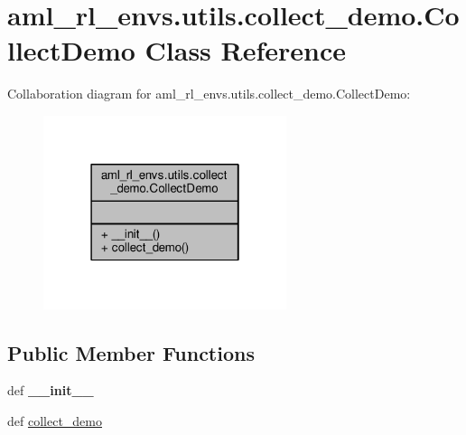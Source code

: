 \hypertarget{classaml__rl__envs_1_1utils_1_1collect__demo_1_1_collect_demo}{\section{aml\-\_\-rl\-\_\-envs.\-utils.\-collect\-\_\-demo.\-Collect\-Demo Class Reference}
\label{classaml__rl__envs_1_1utils_1_1collect__demo_1_1_collect_demo}
}


Collaboration diagram for aml\-\_\-rl\-\_\-envs.\-utils.\-collect\-\_\-demo.\-Collect\-Demo\-:
\nopagebreak
\begin{figure}[H]
\begin{center}
\leavevmode
\includegraphics[width=202pt]{classaml__rl__envs_1_1utils_1_1collect__demo_1_1_collect_demo__coll__graph}
\end{center}
\end{figure}
\subsection*{Public Member Functions}
\begin{DoxyCompactItemize}
\item 
\hypertarget{classaml__rl__envs_1_1utils_1_1collect__demo_1_1_collect_demo_a1b07cfe9958d55c570fab894fd16885e}{def {\bfseries \-\_\-\-\_\-init\-\_\-\-\_\-}}\label{classaml__rl__envs_1_1utils_1_1collect__demo_1_1_collect_demo_a1b07cfe9958d55c570fab894fd16885e}

\item 
def \hyperlink{classaml__rl__envs_1_1utils_1_1collect__demo_1_1_collect_demo_ae1557aff3e4b280f363880b9cb063e16}{collect\-\_\-demo}
\end{DoxyCompactItemize}



